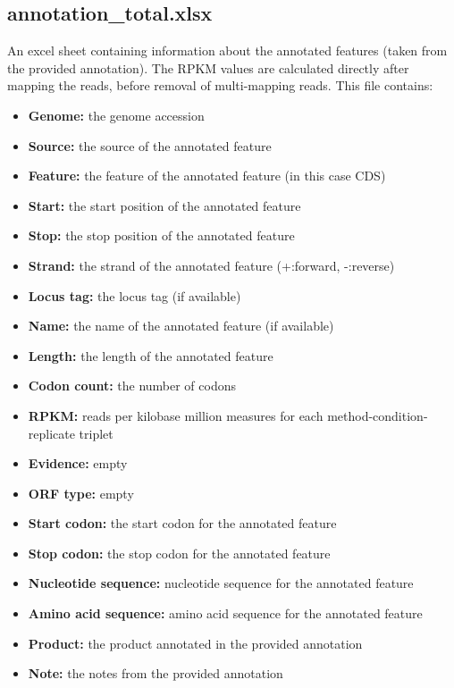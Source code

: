 \documentclass[10pt,a4paper]{article}
\begin{document}
\subsection*{annotation\_total.xlsx}
An excel sheet containing information about the annotated features (taken from the provided annotation). The RPKM values are calculated directly after mapping the reads, before removal of multi-mapping reads. This file contains: 
\begin{itemize}
\item \textbf{Genome:} the genome accession 
\item \textbf{Source:} the source of the annotated feature 
\item \textbf{Feature:} the feature of the annotated feature (in this case CDS)
\item \textbf{Start:} the start position of the annotated feature
\item \textbf{Stop:} the stop position of the annotated feature
\item \textbf{Strand:} the strand of the annotated feature (+:forward, -:reverse)
\item \textbf{Locus tag:} the locus tag (if available)
\item \textbf{Name:} the name of the annotated feature (if available)
\item \textbf{Length:} the length of the annotated feature
\item \textbf{Codon count:} the number of codons
\item \textbf{RPKM:} reads per kilobase million measures for each method-condition-replicate triplet
\item \textbf{Evidence:} empty
\item \textbf{ORF type:} empty
\item \textbf{Start codon:} the start codon for the annotated feature
\item \textbf{Stop codon:} the stop codon for the annotated feature
\item \textbf{Nucleotide sequence:} nucleotide sequence for the annotated feature
\item \textbf{Amino acid sequence:} amino acid sequence for the annotated feature
\item \textbf{Product:} the product annotated in the provided annotation
\item \textbf{Note:} the notes from the provided annotation
\end{itemize}
\end{document}
